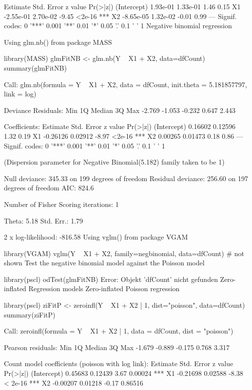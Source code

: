              Estimate Std. Error z value Pr(>|z|)    
(Intercept)  1.93e-01   1.33e-01    1.46     0.15    
X1          -2.55e-01   2.70e-02   -9.45   <2e-16 ***
X2          -8.65e-05   1.32e-02   -0.01     0.99    
---
Signif. codes:  0 '***' 0.001 '**' 0.01 '*' 0.05 '.' 0.1 ' ' 1 
Negative binomial regression

Using glm.nb() from package MASS

library(MASS)
glmFitNB <- glm.nb(Y ~ X1 + X2, data=dfCount)
summary(glmFitNB)

Call:
glm.nb(formula = Y ~ X1 + X2, data = dfCount, init.theta = 5.181857797, 
    link = log)

Deviance Residuals: 
   Min      1Q  Median      3Q     Max  
-2.769  -1.053  -0.232   0.647   2.443  

Coefficients:
            Estimate Std. Error z value Pr(>|z|)    
(Intercept)  0.16602    0.12596    1.32     0.19    
X1          -0.26126    0.02912   -8.97   <2e-16 ***
X2           0.00265    0.01473    0.18     0.86    
---
Signif. codes:  0 '***' 0.001 '**' 0.01 '*' 0.05 '.' 0.1 ' ' 1 

(Dispersion parameter for Negative Binomial(5.182) family taken to be 1)

    Null deviance: 345.33  on 199  degrees of freedom
Residual deviance: 256.60  on 197  degrees of freedom
AIC: 824.6

Number of Fisher Scoring iterations: 1

              Theta:  5.18 
          Std. Err.:  1.79 

 2 x log-likelihood:  -816.58 
Using vglm() from package VGAM

library(VGAM)
vglm(Y ~ X1 + X2, family=negbinomial, data=dfCount)
# not shown
Test the negative binomial model against the Poisson model

library(pscl)
odTest(glmFitNB)
Error: Objekt 'dfCount' nicht gefunden
Zero-inflated Regression models
Zero-inflated Poisson regression

library(pscl)
ziFitP <- zeroinfl(Y ~ X1 + X2 | 1, dist="poisson", data=dfCount)
summary(ziFitP)

Call:
zeroinfl(formula = Y ~ X1 + X2 | 1, data = dfCount, dist = "poisson")

Pearson residuals:
   Min     1Q Median     3Q    Max 
-1.679 -0.889 -0.175  0.768  3.317 

Count model coefficients (poisson with log link):
            Estimate Std. Error z value Pr(>|z|)    
(Intercept)  0.45683    0.12439    3.67  0.00024 ***
X1          -0.21698    0.02588   -8.38  < 2e-16 ***
X2          -0.00207    0.01218   -0.17  0.86516    

